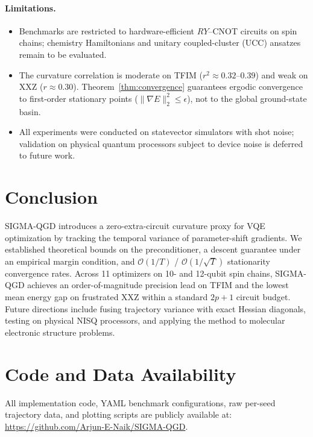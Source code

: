 \documentclass[11pt,a4paper]{article}
\begin{document}
\paragraph{Limitations.}
\begin{itemize}
    \item Benchmarks are restricted to hardware-efficient $RY$--CNOT circuits on spin chains; chemistry Hamiltonians and unitary coupled-cluster (UCC) ansatzes remain to be evaluated.
    \item The curvature correlation is moderate on TFIM ($r^2 \approx 0.32$--$0.39$) and weak on XXZ ($r \approx 0.30$). Theorem~\ref{thm:convergence} guarantees ergodic convergence to first-order stationary points ($\|\nabla E\|_2^2 \le \epsilon$), not to the global ground-state basin.
    \item All experiments were conducted on statevector simulators with shot noise; validation on physical quantum processors subject to device noise is deferred to future work.
\end{itemize}

\section{Conclusion}
\label{sec:conclusion}
SIGMA-QGD introduces a zero-extra-circuit curvature proxy for VQE optimization by tracking the temporal variance of parameter-shift gradients. We established theoretical bounds on the preconditioner, a descent guarantee under an empirical margin condition, and $\mathcal{O}(1/T)$ / $\mathcal{O}(1/\sqrt{T})$ stationarity convergence rates. Across 11 optimizers on 10- and 12-qubit spin chains, SIGMA-QGD achieves an order-of-magnitude precision lead on TFIM and the lowest mean energy gap on frustrated XXZ within a standard $2p+1$ circuit budget. Future directions include fusing trajectory variance with exact Hessian diagonals, testing on physical NISQ processors, and applying the method to molecular electronic structure problems.

\section*{Code and Data Availability}
All implementation code, YAML benchmark configurations, raw per-seed trajectory data, and plotting scripts are publicly available at: \url{https://github.com/Arjun-E-Naik/SIGMA-QGD}.
\end{document}
